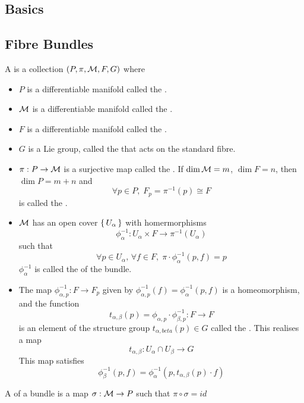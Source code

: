 \documentclass{article}
\begin{document}
\subsection{Basics}


\subsection{Fibre Bundles}

\begin{definition}
A  is a collection $(P,\pi,\mathcal{M},F,G)$ where
\begin{itemize}
    \item $P$ is a differentiable manifold called the .
    \item $\mathcal{M}$ is a differentiable manifold called the .
    \item $F$ is a differentiable manifold called the .
    \item $G$ is a Lie group, called the  that acts on the standard fibre.
    \item $\pi:P\to\mathcal{M}$ is a surjective map called the . If $\dim\mathcal{M} = m$, $\dim F = n$, then $\dim P = m+n$ and \[
    \forall p\in P, \; F_p = \pi^{-1}(p) \cong F
    \]
    is called the .
    \item $\mathcal{M}$ has an open cover $\set{U_\alpha}$ with homermorphisms
    \[
    \phi_\alpha^{-1}: U_\alpha \times F \to \pi^{-1}(U_\alpha)
    \]
    such that 
    \[
    \forall p\in U_\alpha, \, \forall f \in F, \; \pi\cdot\phi_\alpha^{-1}(p,f) = p
    \]
    $\phi_\alpha^{-1}$ is called the  of the bundle.
    \item The map $\phi_{\alpha,p}^{-1} : F\to F_p$ given by $\phi_{\alpha,p}^{-1}(f) = \phi_\alpha^{-1}(p,f)$ is a homeomorphism, and the function 
    \[
    t_{\alpha,\beta}(p) = \phi_{\alpha,p} \cdot \phi_{\beta,p}^{-1} : F \to F
    \]
    is an element of the structure group $t_{\alpha,beta}(p)\in G$ called the . This realises a map 
    \[
    t_{\alpha,\beta} : U_\alpha \cap U_\beta \to G 
    \]
    This map satisfies 
    \[
    \phi_\beta^{-1}(p,f) = \phi_\alpha^{-1} (p, t_{\alpha,\beta}(p) \cdot f )
    \]
    \end{itemize}
\end{definition}

\begin{definition}
A  of a bundle is a map $\sigma:\mathcal{M}\to P$ such that $\pi\circ\sigma=id$
\end{definition}
\end{document}
